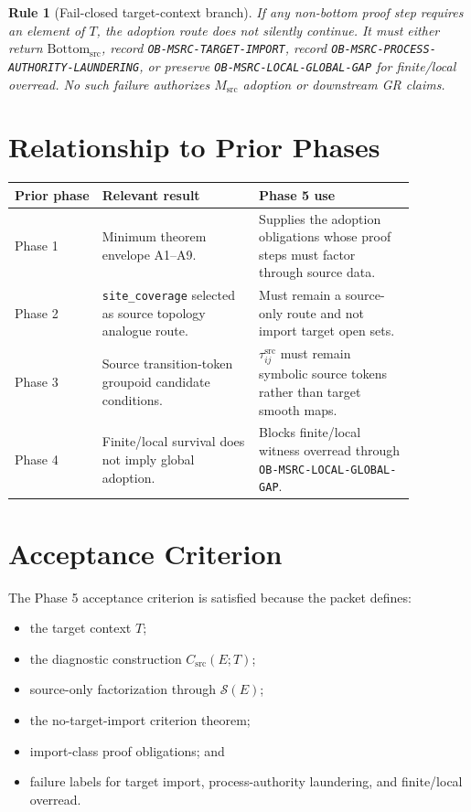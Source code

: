 \documentclass[11pt]{article}
\newcommand{\Msrc}{M_{\mathrm{src}}}
\newcommand{\Bottomsrc}{\mathrm{Bottom}_{\mathrm{src}}}
\newcommand{\Csrc}{C_{\mathrm{src}}}
\newcommand{\Tctx}{T}
\newtheorem{rulebox}{Rule}
\begin{document}
\begin{rulebox}[Fail-closed target-context branch]
If any non-bottom proof step requires an element of \(\Tctx\), the adoption
route does not silently continue. It must either return \(\Bottomsrc\), record
\texttt{OB-MSRC-TARGET-IMPORT}, record
\texttt{OB-MSRC-PROCESS-AUTHORITY-LAUNDERING}, or preserve
\texttt{OB-MSRC-LOCAL-GLOBAL-GAP} for finite/local overread. No such failure
authorizes \(\Msrc\) adoption or downstream GR claims.
\end{rulebox}

\section{Relationship to Prior Phases}

\begin{longtable}{|p{0.19\linewidth}|p{0.34\linewidth}|p{0.34\linewidth}|}
\hline
\textbf{Prior phase} & \textbf{Relevant result} & \textbf{Phase 5 use} \\
\hline
Phase 1 & Minimum theorem envelope A1--A9. & Supplies the adoption obligations whose proof steps must factor through source data. \\
\hline
Phase 2 & \texttt{site\_coverage} selected as source topology analogue route. & Must remain a source-only route and not import target open sets. \\
\hline
Phase 3 & Source transition-token groupoid candidate conditions. & \(\tau_{ij}^{\mathrm{src}}\) must remain symbolic source tokens rather than target smooth maps. \\
\hline
Phase 4 & Finite/local survival does not imply global adoption. & Blocks finite/local witness overread through \texttt{OB-MSRC-LOCAL-GLOBAL-GAP}. \\
\hline
\end{longtable}

\section{Acceptance Criterion}

The Phase 5 acceptance criterion is satisfied because the packet defines:

\begin{itemize}
  \item the target context \(\Tctx\);
  \item the diagnostic construction \(\Csrc(E;\Tctx)\);
  \item source-only factorization through \(\mathcal{S}(E)\);
  \item the no-target-import criterion theorem;
  \item import-class proof obligations; and
  \item failure labels for target import, process-authority laundering, and
        finite/local overread.
\end{itemize}
\end{document}
